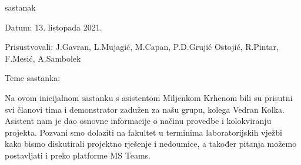 \begin{packed_enum}
			\item  sastanak
			\item[] \begin{packed_item}
				\item Datum: 13. listopada 2021.
				\item Prisustvovali: J.Gavran, L.Mujagić, M.Capan, P.D.Grujić Ostojić, R.Pintar, F.Mesić, A.Sambolek
				\item Teme sastanka:
				\begin{packed_item}
					\item  Na ovom inicijalnom sastanku s asistentom Miljenkom Krhenom bili su prisutni svi članovi tima i demonstrator zadužen za našu grupu, kolega Vedran Kolka.
					Asistent nam je dao osnovne informacije o načinu provedbe i kolokviranju projekta. Pozvani smo dolaziti na fakultet u terminima laboratorijskih vježbi kako bismo
					diskutirali projektno rješenje i nedoumice, a također pitanja možemo postavljati i preko platforme MS Teams.
					

\end{packed_item}
\end{packed_item}
\end{packed_enum}
